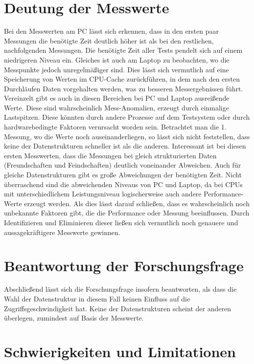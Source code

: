 \documentclass[11pt,a4paper]{article}
\begin{document}
\section{Deutung der Messwerte}

Bei den Messwerten am PC lässt sich erkennen, dass in den ersten paar Messungen die
benötigte Zeit deutlich höher ist als bei den restlichen, nachfolgenden Messungen.
Die benötigte Zeit aller Tests pendelt sich auf einem niedrigeren Niveau ein.
Gleiches ist auch am Laptop zu beobachten, wo die Messpunkte jedoch unregelmäßiger sind.
Dies lässt sich vermutlich auf eine Speicherung von Werten im CPU-Cache zurückführen,
in dem nach den ersten Durchläufen Daten vorgehalten werden, was zu besseren
Messergebnissen führt.
Vereinzelt gibt es auch in diesen Bereichen bei PC und Laptop ausreißende Werte.
Diese sind wahrscheinlich Mess-Anomalien, erzeugt durch einmalige Lastspitzen.
Diese könnten durch andere Prozesse auf dem Testsystem oder durch hardwarebedingte 
Faktoren verursacht worden sein.
Betrachtet man die 1. Messung, wo die Werte noch auseinanderliegen,
so lässt sich nicht feststellen, dass keine der Datenstrukturen schneller
ist als die anderen. Interessant ist bei diesen ersten Messwerten, dass die Messungen
bei gleich strukturierten Daten (Freundschaften und Feindschaften) deutlich voneinander
Abweichen. Auch für gleiche Datenstrukturen gibt es große Abweichungen der
benötigten Zeit.
Nicht überraschend sind die abweichenden Niveaus von PC und Laptop,
da bei CPUs mit unterschiedlichem Leistungsniveau logischerweise auch andere
Performance-Werte erzeugt werden.
Als dies lässt darauf schließen, dass es wahrscheinlich noch
unbekannte Faktoren gibt, die die Performance oder Messung beeinflussen.
Durch Identifizieren und Eliminieren dieser ließen sich vermutlich noch
genauere und aussagekräftigere Messwerte gewinnen.

\section{Beantwortung der Forschungsfrage}

Abschließend lässt sich die Forschungsfrage insofern beantworten, als dass
die Wahl der Datenstruktur in diesem Fall keinen Einfluss auf die Zugriffsgeschwindigkeit
hat. Keine der Datenstrukturen scheint der anderen überlegen, zumindest auf Basis
der Messwerte.

\section{Schwierigkeiten und Limitationen}
\end{document}
